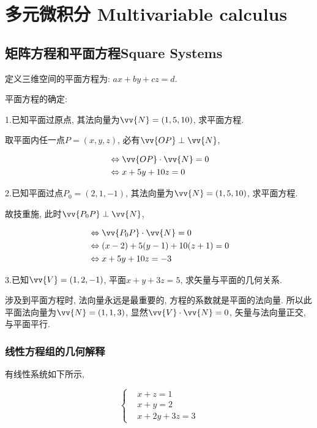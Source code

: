 \chapter{多元微积分 Multivariable calculus}

\section{矩阵方程和平面方程Square Systems}

定义三维空间的平面方程为: $ ax+by+cz=d $.

平面方程的确定:

1.已知平面过原点, 其法向量为$ \vv{N}=(1,5,10) $, 求平面方程.

取平面内任一点$ P=(x,y,z) $, 必有$ \vv{OP} \perp \vv{N} $,

\begin{equation}
\begin{aligned}
&\Leftrightarrow \vv{OP}\cdot\vv{N} = 0 \\
&\Leftrightarrow x+5y+10z=0
\end{aligned}
\end{equation}

2.已知平面过点$ P_0=(2,1,-1) $, 其法向量为$ \vv{N}=(1,5,10) $, 求平面方程.

故技重施, 此时$ \vv{P_0 P} \perp \vv{N} $,

\begin{equation}
\begin{aligned}
&\Leftrightarrow \vv{P_0 P}\cdot\vv{N} = 0 \\
&\Leftrightarrow (x-2)+5(y-1)+10(z+1)=0 \\
&\Leftrightarrow x+5y+10z=-3
\end{aligned}
\end{equation}

3.已知$ \vv{V}=(1,2,-1) $, 平面$ x+y+3z=5 $, 求矢量与平面的几何关系.

涉及到平面方程时, 法向量永远是最重要的, 方程的系数就是平面的法向量. 所以此平面法向量为$ \vv{N}=(1,1,3) $, 显然$ \vv{V}\cdot \vv{N}=0 $, 矢量与法向量正交, 与平面平行.

\subsection{线性方程组的几何解释}

有线性系统如下所示,

\begin{equation}
\begin{cases}
& x+z=1 \\
& x+y=2 \\
& x+2y+3z=3
\end{cases}
\end{equation}

